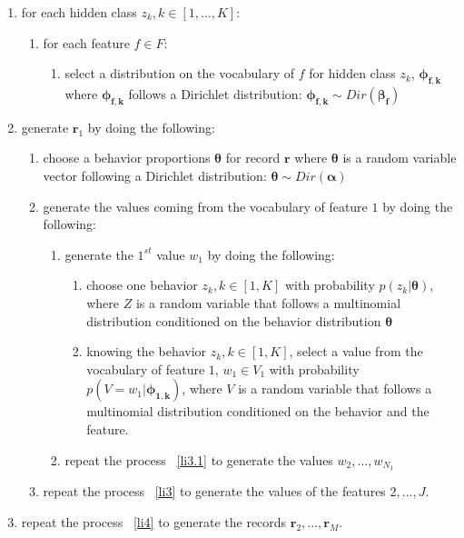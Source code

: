 \begin{enumerate} 
	\item for each hidden class $z_{k}, k\in[1,...,K]$:
		\begin{enumerate}
		 	\item for each feature $f\in F$:
	 		 	\begin{enumerate}
		 			\item select a distribution on the vocabulary of $f$ for hidden class $z_{k}$, $\boldsymbol{\phi _{f,k}}$ where $\boldsymbol{\phi _{f,k}}$ follows a Dirichlet distribution: $\boldsymbol{\phi _{f,k}}\sim 								Dir(\boldsymbol{\beta _{f}})$ \label{li2} 
		 		\end{enumerate}
		\end{enumerate}
	\item generate $\mathbf{r}_{1}$ by doing the following: \label{li4}
		\begin{enumerate}
			\item choose a behavior proportions $\boldsymbol{\theta }$ for record $\mathbf{r}$ where $\boldsymbol{\theta }$ is a random variable vector following a Dirichlet distribution: $\boldsymbol{\theta }\sim 								Dir(\boldsymbol{\alpha })$ \label{li2} 
			\item generate the values coming from the vocabulary of feature $1$ by doing the following: \label{li3}
	 			\begin{enumerate}
		 			\item generate the $1^{st}$ value $w_1$ by doing the following: \label{li3.1}
	 		 			\begin{enumerate}
		 					\item choose one behavior $z_{k},k\in [1,K]$ with probability $p(z_{k}|\boldsymbol{\theta })$, where $Z$ is a random variable that follows a multinomial distribution conditioned on the behavior 									distribution $\boldsymbol{\theta }$
		 					\item knowing the behavior $z_{k},k\in [1,K]$, select a value from the vocabulary of feature $1$, $w_{1} \in V_{1}$ with probability $p(V=w_{1}|\boldsymbol{\phi _{1,k}})$, where $V$ is a random 								variable that follows a multinomial distribution conditioned on the behavior and the feature.
		 				\end{enumerate}
					\item repeat the process ~\ref{li3.1} to generate the values $w_{2},...,w_{N_{1}}$
				\end{enumerate} 
			\item repeat the process ~\ref{li3} to generate the values of the features $2,...,J$. 
		\end{enumerate}
	\item repeat the process ~\ref{li4} to generate the records $\mathbf{r}_{2},...,\mathbf{r}_{M}$. 
\end{enumerate} \par

